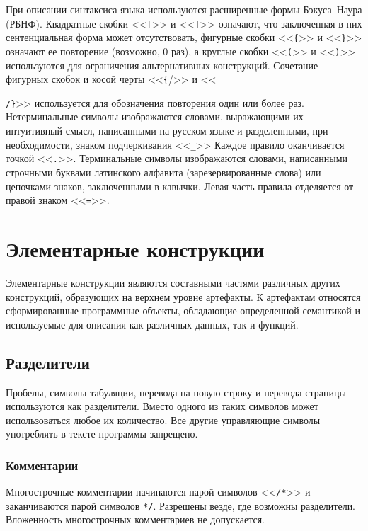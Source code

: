 При описании синтаксиса языка используются расширенные формы Бэкуса--На\-у\-ра (РБНФ). Квадратные скобки <<\texttt{[}>> и <<\texttt{]}>> означают, что заключенная в них сентенциальная форма может отсутствовать, фигурные скобки <<\texttt{\{}>> и <<\texttt{\}}>> означают ее повторение (возможно, 0 раз), а круглые скобки <<\texttt{(}>> и <<\texttt{)}>> используются для ограничения альтернативных конструкций. Сочетание фигурных скобок и косой черты <<\texttt{\{}/>> и <<{\texttt{/\}}>> используется для обозначения повторения один или более раз. Нетерминальные символы изображаются словами, выражающими их интуитивный смысл, написанными на русском языке и разделенными, при необходимости, знаком подчеркивания <<\texttt{\_}>> Каждое правило оканчивается точкой <<\texttt{.}>>. Терминальные символы изображаются словами, написанными строчными буквами латинского алфавита (зарезервированные слова) или цепочками знаков, заключенными в кавычки. Левая часть правила отделяется от правой знаком <<\texttt{=}>>.

\section{Элементарные конструкции}
\label{smile:elem}

Элементарные конструкции являются составными частями различных других конструкций, образующих на верхнем уровне артефакты. К артефактам относятся сформированные программные объекты, обладающие определенной семантикой и используемые для описания как различных данных, так и функций.

\subsection{Разделители}
\label{smile:elem:skip}

Пробелы, символы табуляции, перевода на новую строку и перевода страницы используются как разделители. Вместо одного из таких символов может использоваться любое их количество. Все другие управляющие символы употреблять в тексте программы запрещено.

\subsubsection{Комментарии}
\label{smile:elem:comment}

Многострочные комментарии начинаются парой символов <<\verb|/*|>> и заканчиваются парой символов \verb|*/|. Разрешены везде, где возможны разделители. Вложенность многострочных комментариев не допускается.

}

